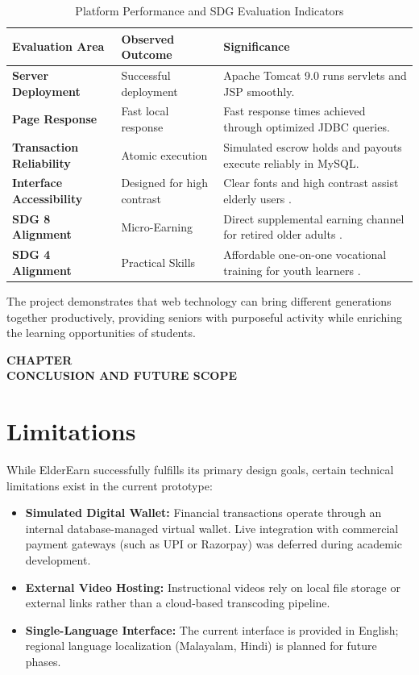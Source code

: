 \documentclass[12pt,a4paper]{report}
\newcommand{\chaptertitlepage}[1]{%
  \clearpage
  \thispagestyle{empty}
  \null
  \vfill
  \begin{center}
    {\fontsize{16pt}{18pt}\selectfont\bfseries CHAPTER \thechapter}\\[0.5cm]
    {\fontsize{16pt}{18pt}\selectfont\bfseries #1}
  \end{center}
  \vfill
  \null
  \clearpage
  \setcounter{section}{0}
}
\begin{document}
\begin{table}[H]
\centering
\small
\caption{Platform Performance and SDG Evaluation Indicators}
\label{tab:outcomes_metrics}
\begin{tabularx}{\textwidth}{|L{3.5cm}|L{3.2cm}|J|}
\hline
\textbf{Evaluation Area} & \textbf{Observed Outcome} & \textbf{Significance} \\ \hline
\textbf{Server Deployment} & Successful deployment & Apache Tomcat 9.0 runs servlets and JSP smoothly. \\ \hline
\textbf{Page Response} & Fast local response & Fast response times achieved through optimized JDBC queries. \\ \hline
\textbf{Transaction Reliability} & Atomic execution & Simulated escrow holds and payouts execute reliably in MySQL. \\ \hline
\textbf{Interface Accessibility} & Designed for high contrast & Clear fonts and high contrast assist elderly users \cite{wcag21}. \\ \hline
\textbf{SDG 8 Alignment} & Micro-Earning & Direct supplemental earning channel for retired older adults \cite{unsdg}. \\ \hline
\textbf{SDG 4 Alignment} & Practical Skills & Affordable one-on-one vocational training for youth learners \cite{unescoskills}. \\ \hline
\end{tabularx}
\end{table}

The project demonstrates that web technology can bring different generations together productively, providing seniors with purposeful activity while enriching the learning opportunities of students.

\chaptertitlepage{CONCLUSION AND FUTURE SCOPE}

\section{Limitations}
While ElderEarn successfully fulfills its primary design goals, certain technical limitations exist in the current prototype:
\begin{itemize}[leftmargin=1.5em, itemsep=2pt]
  \item \textbf{Simulated Digital Wallet:} Financial transactions operate through an internal database-managed virtual wallet. Live integration with commercial payment gateways (such as UPI or Razorpay) was deferred during academic development.
  \item \textbf{External Video Hosting:} Instructional videos rely on local file storage or external links rather than a cloud-based transcoding pipeline.
  \item \textbf{Single-Language Interface:} The current interface is provided in English; regional language localization (Malayalam, Hindi) is planned for future phases.
\end{itemize}
\end{document}
